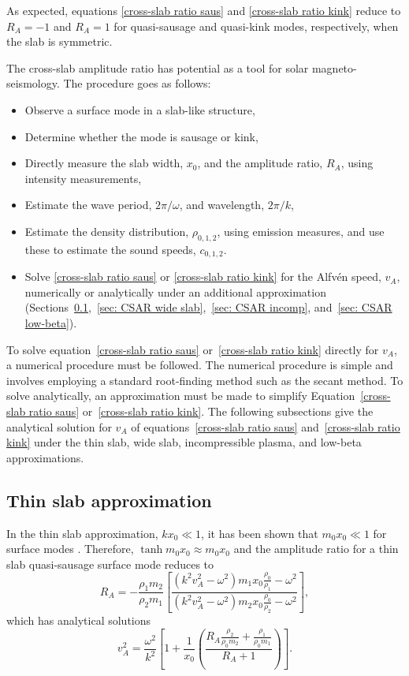 \documentclass[namedreferences]{solarphysics}
\numberwithin{equation}{section}
\begin{document}
\begin{article}
As expected, equations \eqref{cross-slab ratio saus} and \eqref{cross-slab ratio kink} reduce to $R_A = -1$ and $R_A = 1$ for quasi-sausage and quasi-kink modes, respectively, when the slab is symmetric.

The cross-slab amplitude ratio has potential as a tool for solar magneto-seismology. The procedure goes as follows:
\begin{itemize}
\item Observe a surface mode in a slab-like structure,
\item Determine whether the mode is sausage or kink,
\item Directly measure the slab width, $x_0$, and the amplitude ratio, $R_A$, using intensity measurements,
\item Estimate the wave period, $2\pi / \omega$, and wavelength, $2\pi / k$,
\item Estimate the density distribution, $\rho_{0,1,2}$, using emission measures, and use these to estimate the sound speeds, $c_{0,1,2}$.
\item Solve \eqref{cross-slab ratio saus} or \eqref{cross-slab ratio kink} for the Alfv\'{e}n speed, $v_A$, numerically or analytically under an additional approximation (Sections~\ref{sec: CSAR thin slab},~\ref{sec: CSAR wide slab},~\ref{sec: CSAR incomp}, and~\ref{sec: CSAR low-beta}).
\end{itemize}

To solve equation~\eqref{cross-slab ratio saus} or~\eqref{cross-slab ratio kink} directly for $v_A$, a numerical procedure must be followed. The numerical procedure is simple and involves employing a standard root-finding method such as the secant method. To solve analytically, an approximation must be made to simplify Equation~\eqref{cross-slab ratio saus} or~\eqref{cross-slab ratio kink}. The following subsections give the analytical solution for $v_A$ of equations~\eqref{cross-slab ratio saus} and~\eqref{cross-slab ratio kink} under the thin slab, wide slab, incompressible plasma, and low-beta approximations.


\subsection{Thin slab approximation} \label{sec: CSAR thin slab}
In the thin slab approximation, $kx_0 \ll 1$, it has been shown that $m_0x_0 \ll 1$ for surface modes \citep{rob81b}. Therefore, $\tanh{m_0x_0} \approx m_0x_0$ and the amplitude ratio for a thin slab quasi-sausage surface mode reduces to
\begin{equation}
R_A = -\frac{\rho_1m_2}{\rho_2m_1}\left[\frac{(k^2v_A^2-\omega^2)m_1x_0\frac{\rho_0}{\rho_1}-\omega^2}{(k^2v_A^2-\omega^2)m_2x_0\frac{\rho_0}{\rho_2}-\omega^2}\right], 
\end{equation}
which has analytical solutions
\begin{equation}
v_A^2 = \frac{\omega^2}{k^2} \left[1 + \frac{1}{x_0}\left(\frac{R_A\frac{\rho_2}{\rho_0m_2} + \frac{\rho_1}{\rho_0m_1}}{R_A + 1}\right)\right].
\end{equation}


\end{article}
\end{document}
